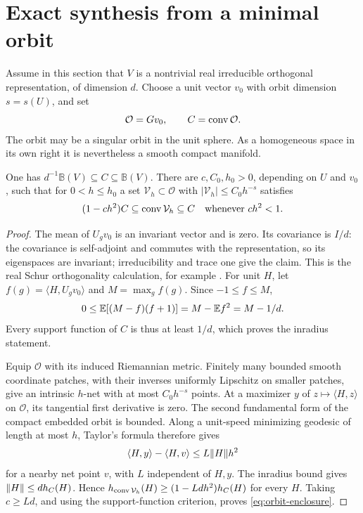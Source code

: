\section{Exact synthesis from a minimal orbit}\label{sec:synthesis}
Assume in this section that $V$ is a nontrivial real irreducible
orthogonal representation, of dimension $d$. Choose a unit vector
$v_0$ with orbit dimension $s=s(U)$, and set
\[
 \mathcal O=Gv_0,\qquad C=\operatorname{conv}\mathcal O.
\]
The orbit may be a singular orbit in the unit sphere. As a homogeneous
space in its own right it is nevertheless a smooth compact manifold.

\begin{lemma}
\label{lem:orbit-enclosure}
One has $d^{-1}\mathbb B(V)\subseteq C\subseteq\mathbb B(V)$.
There are $c,C_0,h_0>0$, depending on $U$ and $v_0$, such that for
$0<h\le h_0$ a set $\mathcal V_h\subset\mathcal O$ with
$|\mathcal V_h|\le C_0h^{-s}$ satisfies
\begin{equation}\label{eq:orbit-enclosure}
 (1-ch^2)C\subseteq\operatorname{conv}\mathcal V_h\subseteq C
 \quad\hbox{whenever }ch^2<1.
\end{equation}
\end{lemma}
\begin{proof}
The mean of $U_gv_0$ is an invariant vector and is zero. Its covariance
is $I/d$: the covariance is self-adjoint and commutes with the
representation, so its eigenspaces are invariant; irreducibility and
trace one give the claim. This is the real Schur orthogonality
calculation, for example \cite[Lemma 5]{Barvinok}.
For unit $H$, let $f(g)=\langle H,U_gv_0\rangle$ and
$M=\max_g f(g)$. Since $-1\le f\le M$,
\[
 0\le\mathbb E[(M-f)(f+1)]=M-\mathbb E f^2=M-1/d.
\]
Every support function of $C$ is thus at least $1/d$, which proves
the inradius statement.

Equip $\mathcal O$ with its induced Riemannian metric. Finitely many
bounded smooth coordinate patches, with their inverses uniformly
Lipschitz on smaller patches, give an intrinsic $h$-net with at most
$C_0h^{-s}$ points. At a maximizer $y$ of
$z\mapsto\langle H,z\rangle$ on $\mathcal O$, its tangential
first derivative is zero. The second fundamental form of the compact
embedded orbit is bounded. Along a unit-speed minimizing geodesic
of length at most $h$, Taylor's formula therefore gives
\[
 \langle H,y\rangle-\langle H,v\rangle
                    \le L\lVert H\rVert h^2
\]
for a nearby net point $v$, with $L$ independent of $H,y$.
The inradius bound gives
$\lVert H\rVert\le d h_C(H)$. Hence
$h_{\operatorname{conv}\mathcal V_h}(H)\ge(1-Ldh^2)h_C(H)$ for every $H$.
Taking $c\ge Ld$, and using the support-function criterion, proves
\eqref{eq:orbit-enclosure}.
\end{proof}

